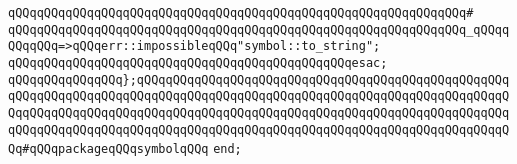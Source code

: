 \verb|qQQqqQQqqQQqqQQqqQQqqQQqqQQqqQQqqQQqqQQqqQQqqQQqqQQqqQQqqQQqqQQq#|\newline
\verb|qQQqqQQqqQQqqQQqqQQqqQQqqQQqqQQqqQQqqQQqqQQqqQQqqQQqqQQqqQQqqQQq_qQQqqQQqqQQq=>qQQqerr::impossibleqQQq"symbol::to_string";|\newline
\verb|qQQqqQQqqQQqqQQqqQQqqQQqqQQqqQQqqQQqqQQqqQQqqQQqesac;|\newline
\newline
\verb|qQQqqQQqqQQqqQQq};qQQqqQQqqQQqqQQqqQQqqQQqqQQqqQQqqQQqqQQqqQQqqQQqqQQqqQQqqQQqqQQqqQQqqQQqqQQqqQQqqQQqqQQqqQQqqQQqqQQqqQQqqQQqqQQqqQQqqQQqqQQqqQQqqQQqqQQqqQQqqQQqqQQqqQQqqQQqqQQqqQQqqQQqqQQqqQQqqQQqqQQqqQQqqQQqqQQqqQQqqQQqqQQqqQQqqQQqqQQqqQQqqQQqqQQqqQQqqQQqqQQqqQQqqQQqqQQqqQQqqQQq#qQQqpackageqQQqsymbolqQQq|\newline
\verb|end;|\newline
\newline
\newline

